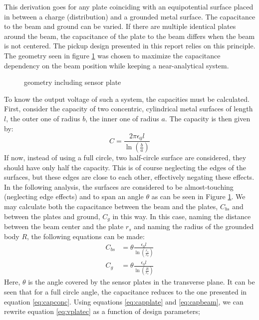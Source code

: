 This derivation goes for any plate coinciding with an equipotential surface placed in between a charge (distribution) and a grounded metal surface. The capacitance to the beam and ground can be varied. 
If there are multiple identical plates around the beam, the capacitance of the plate to the beam differs when the beam is not centered. The pickup design presented in this report relies on this principle.
The geometry seen in figure \ref{fig:geofrontview} was chosen to maximize the capacitance dependency on the beam position while keeping a near-analytical system.
\begin{figure}[hb!]
\centering

\caption{geometry including sensor plate}
\label{fig:geofrontview}
\end{figure}
To know the output voltage of such a system, the capacities must be calculated.
First, consider the capacity of two concentric, cylindrical metal surfaces of length $l$, the outer one of radius $b$, the inner one of radius $a$. The capacity is then given by\cite{GriffithsEM}:
\begin{equation}
C = \frac{2\pi\epsilon_0l}{\ln \left(\frac{b}{a} \right)}
\label{eq:capconc}
\end{equation}
If now, instead of using a full circle, two half-circle surface are considered, they should have only half the capacity. This is of course neglecting the edges of the surfaces, but these edges are close to each other, effectively negating these effects. In the following analysis, the surfaces are considered to be almost-touching (neglecting edge effects) and to span an angle $\theta$ as can be seen in Figure \ref{fig:geofrontview}.
We may calculate both the capacitance between the beam and the plates, $C_{bs}$ and between the plates and ground, $C_g$ in this way. In this case, naming the distance between the beam center and the plate $r_s$ and naming the radius of the grounded body $R$, the following equations can be made:
\begin{align}
C_{bs} &= \theta \frac{\epsilon_0l}{\ln\left(\frac{r_s}{r_b}\right)} \label{eq:capbeam}\\
C_g &= \theta \frac{\epsilon_0l}{\ln\left(\frac{R}{r_s}\right)}
\label{eq:capplate}
\end{align}
Here, $\theta$ is the angle covered by the sensor plates in the transverse plane. It can be seen that for a full circle angle, the capacitance reduces to the one presented in equation \ref{eq:capconc}.
Using equations \ref{eq:capplate} and \ref{eq:capbeam}, we can rewrite equation \ref{eq:vplatec} as a function of design parameters;
